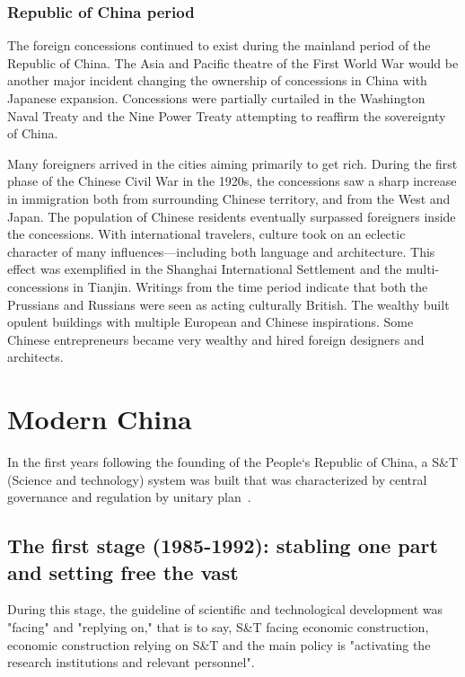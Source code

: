 \subsubsection{Republic of China period}

The foreign concessions continued to exist during the mainland period of the 
Republic of China. The Asia and Pacific theatre of the First World War would 
be another major incident changing the ownership of concessions in China with 
Japanese expansion. Concessions were partially curtailed in the Washington 
Naval Treaty and the Nine Power Treaty attempting to reaffirm the 
sovereignty of China.

Many foreigners arrived in the cities aiming primarily to get rich. During 
the first phase of the Chinese Civil War in the 1920s, the concessions saw 
a sharp increase in immigration both from surrounding Chinese territory, 
and from the West and Japan. The population of Chinese residents eventually 
surpassed foreigners inside the concessions. With international travelers, 
culture took on an eclectic character of many influences—including both 
language and architecture. This effect was exemplified in the Shanghai 
International Settlement and the multi-concessions in Tianjin. Writings from 
the time period indicate that both the Prussians and Russians were seen as 
acting culturally British. The wealthy built opulent buildings with multiple 
European and Chinese inspirations. Some Chinese entrepreneurs became very 
wealthy and hired foreign designers and architects.

\section{Modern China}

In the first years following the founding of the People`s Republic of China, 
a S\&T (Science and technology) system was built that was characterized by 
central governance and regulation by unitary plan~\cite{historicalSandT}.

\subsection{The first stage (1985-1992): stabling one part and setting free the vast}

During this stage, the guideline of scientific and technological development
was "facing" and "replying on," that is to say, S\&T facing economic construction, 
economic construction relying on S\&T and the main policy is "activating the 
research institutions and relevant personnel".

